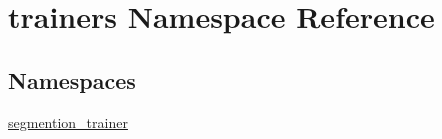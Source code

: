 \hypertarget{namespacetrainers}{}\section{trainers Namespace Reference}
\label{namespacetrainers}
\subsection*{Namespaces}
\begin{DoxyCompactItemize}
\item 
 \mbox{\hyperlink{namespacetrainers_1_1segmention__trainer}{segmention\+\_\+trainer}}
\end{DoxyCompactItemize}
